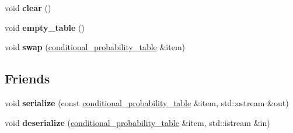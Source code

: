 \begin{DoxyCompactItemize}
\item 
\hypertarget{classdlib_1_1conditional__probability__table_a8609aeb4e06ec372ab4631a86be70301}{
void {\bfseries clear} ()}
\label{classdlib_1_1conditional__probability__table_a8609aeb4e06ec372ab4631a86be70301}

\item 
\hypertarget{classdlib_1_1conditional__probability__table_a873e1d843be718dbd19005efeaa7d0a3}{
void {\bfseries empty\_\-table} ()}
\label{classdlib_1_1conditional__probability__table_a873e1d843be718dbd19005efeaa7d0a3}

\item 
\hypertarget{classdlib_1_1conditional__probability__table_a684f81ed409334eebf7e492067831d22}{
void {\bfseries swap} (\hyperlink{classdlib_1_1conditional__probability__table}{conditional\_\-probability\_\-table} \&item)}
\label{classdlib_1_1conditional__probability__table_a684f81ed409334eebf7e492067831d22}

\end{DoxyCompactItemize}
\subsection*{Friends}
\begin{DoxyCompactItemize}
\item 
\hypertarget{classdlib_1_1conditional__probability__table_a0080cd288987dd9aece2b6dd654ca0cd}{
void {\bfseries serialize} (const \hyperlink{classdlib_1_1conditional__probability__table}{conditional\_\-probability\_\-table} \&item, std::ostream \&out)}
\label{classdlib_1_1conditional__probability__table_a0080cd288987dd9aece2b6dd654ca0cd}

\item 
\hypertarget{classdlib_1_1conditional__probability__table_aee97c3b0a890ea640ee7ba7b80632041}{
void {\bfseries deserialize} (\hyperlink{classdlib_1_1conditional__probability__table}{conditional\_\-probability\_\-table} \&item, std::istream \&in)}
\label{classdlib_1_1conditional__probability__table_aee97c3b0a890ea640ee7ba7b80632041}

\end{DoxyCompactItemize}


